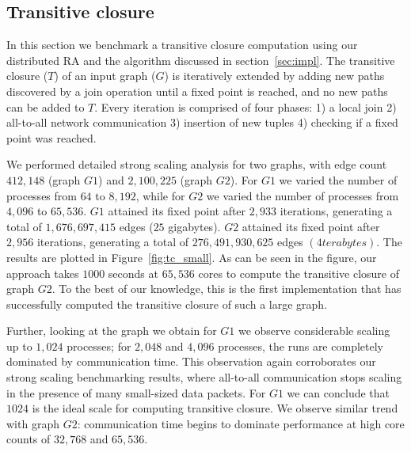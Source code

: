 \subsection{Transitive closure}
\label{sec:tc}

In this section we benchmark a transitive closure computation using our distributed RA and the algorithm discussed in section~\ref{sec:impl}.
The transitive closure ($T$) of an input graph ($G$) is iteratively extended by adding new paths discovered by a join operation until a fixed point is reached, and no new paths can be added to $T$.
Every iteration is comprised of four phases: 1) a local join 2) all-to-all network communication 3) insertion of new tuples 4) checking if a fixed point was reached.


We performed detailed strong scaling analysis for two graphs, with edge count $412,\!148$ (graph $G1$) and $2,\!100,\!225$ (graph $G2$).
For $G1$ we varied the number of processes from $64$ to $8,\!192$, while for $G2$ we varied the number of processes from $4,096$ to $65,\!536$. 
$G1$ attained its fixed point after $2,\!933$ iterations, generating a total of $1,\!676,\!697,\!415$ edges ($25$ gigabytes).
$G2$ attained its fixed point after $2,\!956$ iterations, generating a total of $276,\!491,\!930,\!625$ edges $(4 terabytes)$.
The results are plotted in Figure~\ref{fig:tc_small}. As can be seen in the figure, our approach takes $1000$ seconds at $65,\!536$ cores to compute the transitive closure of graph $G2$. To the best of our knowledge, this is the first implementation that has successfully computed the transitive closure of such a large graph.

Further, looking at the graph we obtain for $G1$ we observe considerable scaling up to $1,024$ processes; for $2,048$ and $4,096$ processes, the runs are completely dominated by communication time. This observation again corroborates our strong scaling benchmarking results, where all-to-all communication stops scaling in the presence of many small-sized data packets. For $G1$ we can conclude that $1024$ is the ideal scale for computing transitive closure.
We observe similar trend with graph $G2$: communication time begins to dominate performance at high core counts of $32,\!768$ and $65,\!536$. %



